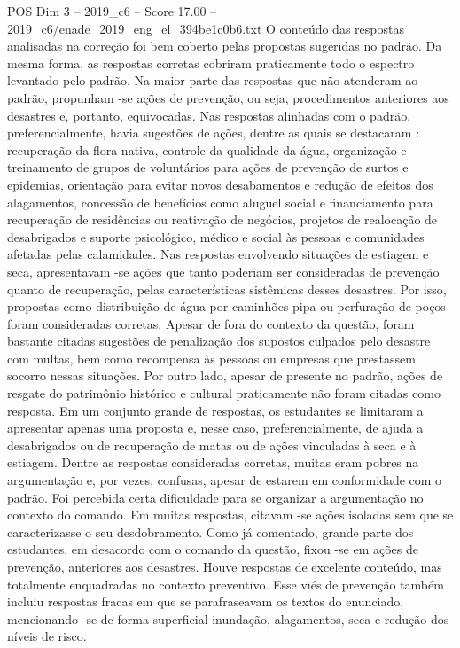 \begin{textsample}{POS Dim 3 – 2019\_c6 – Score 17.00 – 2019\_c6/enade\_2019\_eng\_el\_394be1c0b6.txt}
O conteúdo das respostas analisadas na correção foi bem coberto pelas propostas sugeridas no padrão.
Da mesma forma, as respostas corretas cobriram praticamente todo o espectro levantado pelo padrão.
Na maior parte das respostas que não atenderam ao padrão, propunham -se ações de prevenção, ou seja, procedimentos anteriores aos desastres e, portanto, equivocadas.
Nas respostas alinhadas com o padrão, preferencialmente, havia sugestões de ações, dentre as quais se destacaram : recuperação da flora nativa, controle da qualidade da água, organização e treinamento de grupos de voluntários para ações de prevenção de surtos e epidemias, orientação para evitar novos desabamentos e redução de efeitos dos alagamentos, concessão de benefícios como aluguel social e financiamento para recuperação de residências ou reativação de negócios, projetos de realocação de desabrigados e suporte psicológico, médico e social às pessoas e comunidades afetadas pelas calamidades.
Nas respostas envolvendo situações de estiagem e seca, apresentavam -se ações que tanto poderiam ser consideradas de prevenção quanto de recuperação, pelas características sistêmicas desses desastres.
Por isso, propostas como distribuição de água por caminhões pipa ou perfuração de poços foram consideradas corretas.
Apesar de fora do contexto da questão, foram bastante citadas sugestões de penalização dos supostos culpados pelo desastre com multas, bem como recompensa às pessoas ou empresas que prestassem socorro nessas situações.
Por outro lado, apesar de presente no padrão, ações de resgate do patrimônio histórico e cultural praticamente não foram citadas como resposta.
Em um conjunto grande de respostas, os estudantes se limitaram a apresentar apenas uma proposta e, nesse caso, preferencialmente, de ajuda a desabrigados ou de recuperação de matas ou de ações vinculadas à seca e à estiagem.
Dentre as respostas consideradas corretas, muitas eram pobres na argumentação e, por vezes, confusas, apesar de estarem em conformidade com o padrão.
Foi percebida certa dificuldade para se organizar a argumentação no contexto do comando.
Em muitas respostas, citavam -se ações isoladas sem que se caracterizasse o seu desdobramento.
Como já comentado, grande parte dos estudantes, em desacordo com o comando da questão, fixou -se em ações de prevenção, anteriores aos desastres.
Houve respostas de excelente conteúdo, mas totalmente enquadradas no contexto preventivo.
Esse viés de prevenção também incluiu respostas fracas em que se parafraseavam os textos do enunciado, mencionando -se de forma superficial inundação, alagamentos, seca e redução dos níveis de risco.

\end{textsample}
